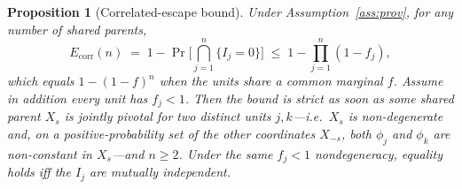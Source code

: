 \documentclass[11pt]{article}
\newtheorem{proposition}{Proposition}
\theoremstyle{definition}
\theoremstyle{remark}
\newcommand{\Esc}{E}
\newcommand{\fesc}{f}
\begin{document}
\begin{proposition}[Correlated-escape bound]\label{prop:corr}
Under Assumption~\ref{ass:prov}, for \emph{any} number of shared parents,
\begin{equation}\label{eq:corr}
\Esc_{\mathrm{corr}}(n)\;=\;1-\Pr\!\Big[\textstyle\bigcap_{j=1}^{n}\{I_j=0\}\Big]
\;\le\;1-\prod_{j=1}^{n}(1-\fesc_j),
\end{equation}
which equals $1-(1-\fesc)^n$ when the units share a common marginal $\fesc$.
Assume in addition every unit has $\fesc_j<1$. Then the bound is strict as soon as some shared parent
$X_s$ is \emph{jointly pivotal} for two distinct units $j,k$---i.e.\ $X_s$ is non-degenerate and, on a
positive-probability set of the other coordinates $X_{-s}$, both $\phi_j$ and $\phi_k$ are non-constant
in $X_s$---and $n\ge2$. Under the same $\fesc_j<1$ nondegeneracy, equality holds \emph{iff} the $I_j$
are mutually independent.
\end{proposition}
\end{document}
